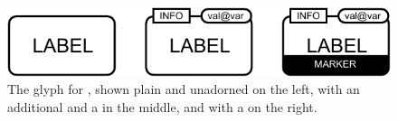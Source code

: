 \begin{figure}[H]
  \centering
  \includegraphics{images/macromolecule-combined}%
  \caption{The \PD glyph for , shown plain and unadorned on the left, with an additional  and a  in the middle, and with a  on the right.}
  \label{fig:macromolecule}
\end{figure}

